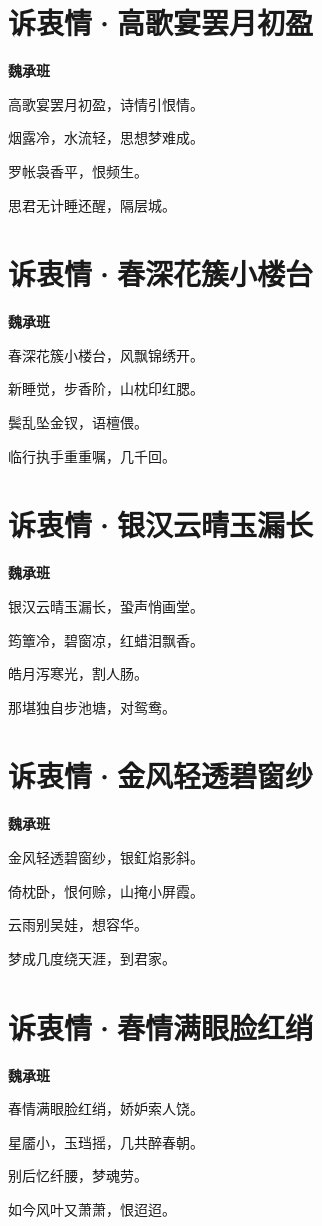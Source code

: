 \documentclass[12pt,a4paper]{ctexbook}
\begin{document}
\section{诉衷情·高歌宴罢月初盈}
\textbf{魏承班}\par\vspace{0.5em}
高歌宴罢月初盈，诗情引恨情。\par
烟露冷，水流轻，思想梦难成。\par
罗帐袅香平，恨频生。\par
思君无计睡还醒，隔层城。\par

\section{诉衷情·春深花簇小楼台}
\textbf{魏承班}\par\vspace{0.5em}
春深花簇小楼台，风飘锦绣开。\par
新睡觉，步香阶，山枕印红腮。\par
鬓乱坠金钗，语檀偎。\par
临行执手重重嘱，几千回。\par

\section{诉衷情·银汉云晴玉漏长}
\textbf{魏承班}\par\vspace{0.5em}
银汉云晴玉漏长，蛩声悄画堂。\par
筠簟冷，碧窗凉，红蜡泪飘香。\par
皓月泻寒光，割人肠。\par
那堪独自步池塘，对鸳鸯。\par

\section{诉衷情·金风轻透碧窗纱}
\textbf{魏承班}\par\vspace{0.5em}
金风轻透碧窗纱，银釭焰影斜。\par
倚枕卧，恨何赊，山掩小屏霞。\par
云雨别吴娃，想容华。\par
梦成几度绕天涯，到君家。\par

\section{诉衷情·春情满眼脸红绡}
\textbf{魏承班}\par\vspace{0.5em}
春情满眼脸红绡，娇妒索人饶。\par
星靥小，玉珰摇，几共醉春朝。\par
别后忆纤腰，梦魂劳。\par
如今风叶又萧萧，恨迢迢。\par
\end{document}
